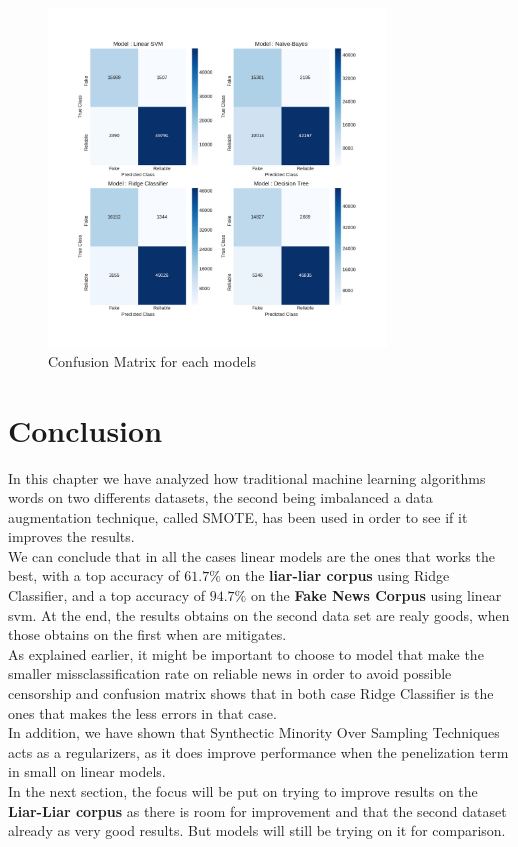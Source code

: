 \begin{figure}
	\centering
	\includegraphics[width=0.8\textwidth]{images/chapitre3/test_SMOTE_fake_confMat}
	\caption{Confusion Matrix for each models}
	\label{fig:chap3:confMat3}
\end{figure}

\section{Conclusion}
In this chapter we have analyzed how traditional machine learning algorithms words on two differents datasets, the second being imbalanced a data augmentation technique, called SMOTE, has been used in order to see if it improves the results. \\

We can conclude that in all the cases linear models are the ones that works the best, with a top accuracy of $61.7\%$ on the \textbf{liar-liar corpus} using Ridge Classifier, and a top accuracy of $94.7\%$ on the \textbf{Fake News Corpus} using linear svm. At the end, the results obtains on the second data set are realy goods, when those obtains on the first when are mitigates. \\

As explained earlier, it might be important to choose to model that make the smaller missclassification rate on reliable news in order to avoid possible censorship and confusion matrix shows that in both case Ridge Classifier is the ones that makes the less errors in that case. \\

In addition, we have shown that Synthectic Minority Over Sampling Techniques acts as a regularizers, as it does improve performance when the penelization term in small on linear models. \\

In the next section, the focus will be put on trying to improve results on the \textbf{Liar-Liar corpus} as there is room for improvement and that the second dataset already as very good results. But models will still be trying on it for comparison. 